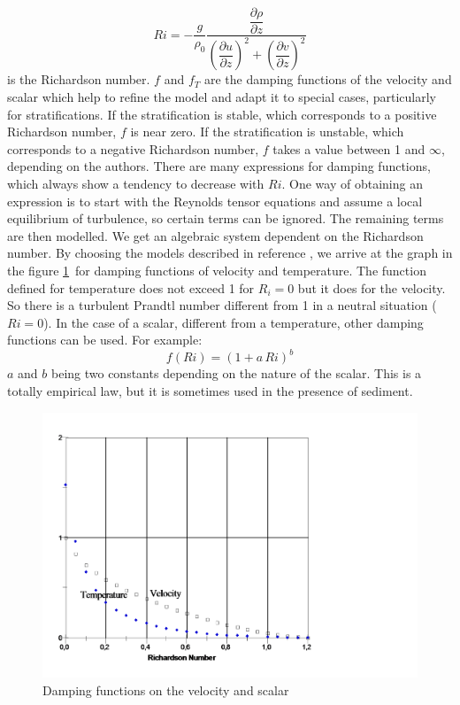 \begin{equation}
  Ri=-\dfrac{g}{\rho_{0}}\dfrac{\dfrac{\partial\rho}{\partial z}}{\left(
      \dfrac{\partial u}{\partial z}\right)  ^{2}+\left(  \dfrac{\partial v}{\partial
        z}\right)  ^{2}}%
\end{equation}
is the Richardson number. $f$ and $f_{T}$ are the damping functions%
of the velocity and scalar which help to refine the model and adapt it to
special cases, particularly for stratifications. If the stratification
is stable, which corresponds to a positive Richardson number,
$f$ is near zero. If the stratification is unstable, which
corresponds to a negative Richardson number,
$f$ takes a value between 1 and $\infty$, depending on the authors.
There are many expressions for damping functions, which always show a tendency
to decrease with $Ri$. One way of obtaining an expression is to start with the
Reynolds tensor equations 
and assume a local equilibrium of turbulence, so certain terms can be ignored.
The remaining terms are then modelled. We get an algebraic system dependent on
the Richardson number. By choosing the models described in reference
\cite{soliva82}, we arrive at the graph in the figure \ref{figure6}\ for damping
functions of velocity and temperature. The function defined for temperature
does not exceed 1 for $R_{i}=0$ but it does for the velocity. So there is a
turbulent Prandtl number different from 1 in a neutral situation ($Ri=0$). In
the case of a scalar, different from a temperature, other damping functions
can be used. For example:
\begin{equation}
f(Ri)=\left(  1+a\,Ri\right)  ^{b}%
\end{equation}
$a$ and $b$ being two constants depending on the nature of the scalar. This is
a totally empirical law, but it is sometimes used in the presence of sediment.

\begin{figure}[H]%
  \centering
  \includegraphics[scale = 0.5, trim=0 0 200 50, clip]{graphics/richardson.pdf}
  \caption{Damping functions on the velocity and scalar}
  \label{figure6}%
\end{figure}

